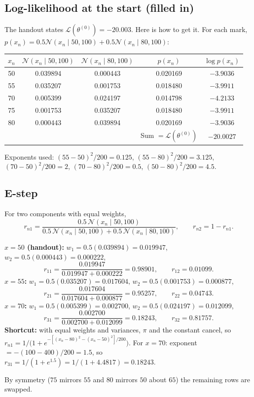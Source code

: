 \documentclass[11pt,a4paper]{article}
\newcommand{\N}{\mathcal{N}}
\newcommand{\LL}{\mathcal{L}}
\begin{document}
\subsection{Log-likelihood at the start (filled in)}

The handout states $\LL(\theta^{(0)})=-20.003$. Here is how to get it. For each mark, $p(x_n)=0.5\N(x_n\mid50,100)+0.5\N(x_n\mid80,100)$:
\begin{center}
\begin{tabular}{@{}ccccc@{}}
\toprule
$x_n$ & $\N(x_n\mid50,100)$ & $\N(x_n\mid80,100)$ & $p(x_n)$ & $\log p(x_n)$\\
\midrule
50 & 0.039894 & 0.000443 & 0.020169 & $-3.9036$\\
55 & 0.035207 & 0.001753 & 0.018480 & $-3.9911$\\
70 & 0.005399 & 0.024197 & 0.014798 & $-4.2133$\\
75 & 0.001753 & 0.035207 & 0.018480 & $-3.9911$\\
80 & 0.000443 & 0.039894 & 0.020169 & $-3.9036$\\
\midrule
& & & Sum $=\LL(\theta^{(0)})$ & $\mathbf{-20.0027}$\\
\bottomrule
\end{tabular}
\end{center}
Exponents used: $(55-50)^2/200=0.125$, $(55-80)^2/200=3.125$, $(70-50)^2/200=2$, $(70-80)^2/200=0.5$, $(50-80)^2/200=4.5$.

\subsection{E-step}

For two components with equal weights,
\[
r_{n1}=\frac{0.5\,\N(x_n\mid50,100)}{0.5\,\N(x_n\mid50,100)+0.5\,\N(x_n\mid80,100)},\qquad r_{n2}=1-r_{n1}.
\]

\begin{example}
\textbf{$x=50$ (handout):} $w_1=0.5(0.039894)=0.019947$, $w_2=0.5(0.000443)=0.000222$,
\[
r_{11}=\frac{0.019947}{0.019947+0.000222}=0.98901,\qquad r_{12}=0.01099.
\]
\textbf{$x=55$:} $w_1=0.5(0.035207)=0.017604$, $w_2=0.5(0.001753)=0.000877$,
\[
r_{21}=\frac{0.017604}{0.017604+0.000877}=0.95257,\qquad r_{22}=0.04743.
\]
\textbf{$x=70$:} $w_1=0.5(0.005399)=0.002700$, $w_2=0.5(0.024197)=0.012099$,
\[
r_{31}=\frac{0.002700}{0.002700+0.012099}=0.18243,\qquad r_{32}=0.81757.
\]
\textbf{Shortcut:} with equal weights and variances, $\pi$ and the constant cancel, so
$r_{n1}=1/\big(1+e^{-[(x_n-80)^2-(x_n-50)^2]/200}\big)$. For $x=70$: exponent $=-(100-400)/200=1.5$, so $r_{31}=1/(1+e^{1.5})=1/(1+4.4817)=0.18243$.

By symmetry ($75$ mirrors $55$ and $80$ mirrors $50$ about $65$) the remaining rows are swapped.
\end{example}
\end{document}
